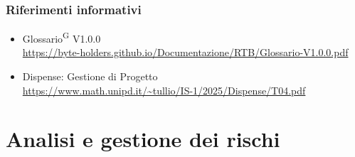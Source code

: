 \documentclass[a4paper, 11pt]{article}
\begin{document}
\subsubsection{Riferimenti informativi}
\begin{itemize}
  \item
	Glossario\textsuperscript{G} V1.0.0\\
	\url{https://byte-holders.github.io/Documentazione/RTB/Glossario-V1.0.0.pdf}
  \item
  	Dispense: Gestione di Progetto\\
  	\url{https://www.math.unipd.it/~tullio/IS-1/2025/Dispense/T04.pdf}
\end{itemize}

\newpage

\section{Analisi e gestione dei rischi}
\end{document}
